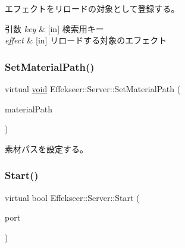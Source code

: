 エフェクトをリロードの対象として登録する。 


\begin{DoxyParams}{引数}
{\em key} & \mbox{[}in\mbox{]} 検索用キー \\
\hline
{\em effect} & \mbox{[}in\mbox{]} リロードする対象のエフェクト \\
\hline
\end{DoxyParams}
\mbox{\label{class_effekseer_1_1_server_a4c0d31a5fd39184615179157a6929296}} 
\subsubsection{\texorpdfstring{Set\+Material\+Path()}{SetMaterialPath()}}
{\footnotesize\ttfamily virtual \mbox{\hyperlink{namespace_effekseer_ab34c4088e512200cf4c2716f168deb56}{void}} Effekseer\+::\+Server\+::\+Set\+Material\+Path (\begin{DoxyParamCaption}\item[{const \mbox{\hyperlink{_effekseer_8h_aca7eb5de6dd019c19ac58ea35a193f2f}{E\+F\+K\+\_\+\+C\+H\+AR}} $\ast$}]{material\+Path }\end{DoxyParamCaption})\hspace{0.3cm}{\ttfamily [pure virtual]}}



素材パスを設定する。 

\mbox{\label{class_effekseer_1_1_server_afd333e58d1330710673caf909452a4c1}} 
\subsubsection{\texorpdfstring{Start()}{Start()}}
{\footnotesize\ttfamily virtual bool Effekseer\+::\+Server\+::\+Start (\begin{DoxyParamCaption}\item[{uint16\+\_\+t}]{port }\end{DoxyParamCaption})\hspace{0.3cm}{\ttfamily [pure virtual]}}



